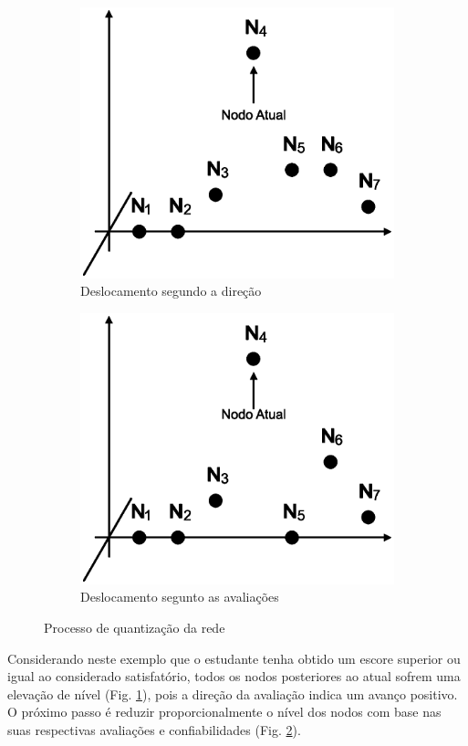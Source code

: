 \begin{figure}
\begin{subfigure}{.5\textwidth}
  		\centering
  		\includegraphics[width=.9\linewidth]{figuras/nodos3.eps}
  		\caption{Deslocamento segundo a direção}
  		\label{fig:subnodos3}
	\end{subfigure}
	\begin{subfigure}{.5\textwidth}
  		\centering
  		\includegraphics[width=.9\linewidth]{figuras/nodos4.eps}
  		\caption{Deslocamento segunto as avaliações}
  		\label{fig:subnodos4}
	\end{subfigure}
	\caption{Processo de quantização da rede}
	\label{fig:nodos}
\end{figure}

Considerando neste exemplo que o estudante tenha obtido um escore superior ou igual ao considerado satisfatório, todos os nodos posteriores ao atual sofrem uma elevação de nível (Fig. \ref{fig:subnodos3}), pois a direção da avaliação indica um avanço positivo. O próximo passo é reduzir proporcionalmente o nível dos nodos com base nas suas respectivas avaliações e confiabilidades (Fig. \ref{fig:subnodos4}).

